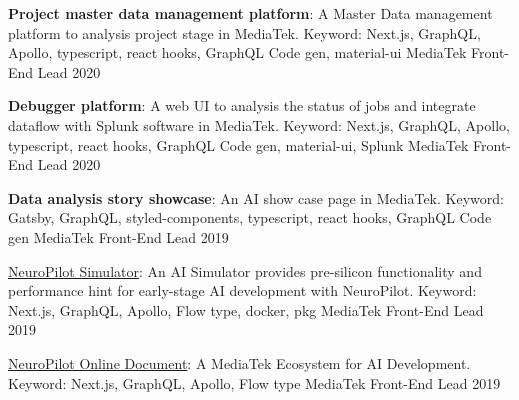 
\begin{cvhonors}

  \cvhonor
    {\textbf{Project master data management platform}: \textmd{A Master Data management platform to analysis project stage in MediaTek. Keyword: Next.js, GraphQL, Apollo, typescript, react hooks, GraphQL Code gen, material-ui}} %
    {MediaTek} %
    {Front-End Lead} %
    {2020} %

  \cvhonor
    {\textbf{Debugger platform}: \textmd{A web UI to analysis the status of jobs and integrate dataflow with Splunk software in MediaTek. Keyword: Next.js, GraphQL, Apollo, typescript, react hooks, GraphQL Code gen, material-ui, Splunk}} %
    {MediaTek} %
    {Front-End Lead} %
    {2020} %

  \cvhonor
    {\textbf{Data analysis story showcase}: \textmd{An AI show case page in MediaTek. Keyword: Gatsby, GraphQL, styled-components, typescript, react hooks, GraphQL Code gen}} %
    {MediaTek} %
    {Front-End Lead} %
    {2019} %

  \cvhonor
    {\href{https://neuropilot.mediatek.com/}{NeuroPilot Simulator}: \textmd{An AI Simulator provides pre-silicon functionality and performance hint for early-stage AI development with NeuroPilot. Keyword: Next.js, GraphQL, Apollo, Flow type, docker, pkg}} %
    {MediaTek} %
    {Front-End Lead} %
    {2019} %

  \cvhonor
    {\href{https://neuropilot.mediatek.com/}{NeuroPilot Online Document}: \textmd{A MediaTek Ecosystem for AI Development. Keyword: Next.js, GraphQL, Apollo, Flow type}} %
    {MediaTek} %
    {Front-End Lead} %
    {2019} %


\end{cvhonors}
